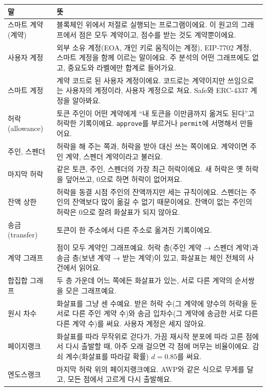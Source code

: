 \documentclass[11pt]{article}
\begin{document}
{\small
\renewcommand{\arraystretch}{1.25}
\begin{longtable}{@{}L{3.6cm}L{11.9cm}@{}}
\toprule
말 & 뜻 \\
\midrule
\endhead
스마트 계약(계약) & 블록체인 위에서 저절로 실행되는 프로그램이에요. 이 원고의 그래프에서 점은 모두 계약이고, 점수를 받는 것도 계약뿐이에요. \\
사용자 계정 & 외부 소유 계정(EOA, 개인 키로 움직이는 계정), EIP-7702 계정, 스마트 계정을 함께 이르는 말이에요. 주 분석의 어떤 그래프에도 없고, 중요도와 라벨에만 합계로 들어가요. \\
스마트 계정 & 계약 코드로 된 사용자 계정이에요. 코드로는 계약이지만 쓰임으로는 사용자의 계정이라, 사용자 계정으로 쳐요. Safe와 ERC-4337 계정을 알아봐요. \\
허락(allowance) & 토큰 주인이 어떤 계약에게 “내 토큰을 이만큼까지 옮겨도 된다”고 허락한 기록이에요. \texttt{approve}를 부르거나 \texttt{permit}에 서명해서 만들어요. \\
주인, 스펜더 & 허락을 해 주는 쪽과, 허락을 받아 대신 쓰는 쪽이에요. 계약이면 주인 계약, 스펜더 계약이라고 불러요. \\
마지막 허락 & 같은 토큰, 주인, 스펜더의 가장 최근 허락이에요. 새 허락은 옛 허락을 덮어쓰고, 0으로 하면 허락이 없어져요. \\
잔액 상한 & 허락을 동결 시점 주인의 잔액까지만 세는 규칙이에요. 스펜더는 주인의 잔액보다 많이 옮길 수 없기 때문이에요. 잔액이 없는 주인의 허락은 0으로 잘려 화살표가 되지 않아요. \\
송금(transfer) & 토큰이 한 주소에서 다른 주소로 옮겨진 기록이에요. \\
계약 그래프 & 점이 모두 계약인 그래프예요. 허락 층(주인 계약 → 스펜더 계약)과 송금 층(보낸 계약 → 받는 계약)이 있고, 화살표는 체인 전체의 사건에서 읽어요. \\
합집합 그래프 & 두 층 가운데 어느 쪽에든 화살표가 있는, 서로 다른 계약의 순서쌍을 모은 그래프예요. \\
원시 차수 & 화살표를 그냥 센 수예요. 받은 허락 수(그 계약에 양수의 허락을 둔 서로 다른 주인 계약 수)와 송금 입차수(그 계약에 송금한 서로 다른 다른 계약 수)를 써요. 사용자 계정은 세지 않아요. \\
페이지랭크 & 화살표를 따라 무작위로 걷다가, 가끔 재시작 분포에 따라 고른 점에서 다시 출발할 때, 아주 오래 걸으면 각 점에 머무는 비율이에요. 감쇠 계수(화살표를 따라갈 확률) $d=0.85$를 써요. \\
엔도스랭크 & 마지막 허락 위의 페이지랭크예요. AWP와 같은 식으로 무게를 달고, 모든 점에서 고르게 다시 출발해요. \\

\end{longtable}}
\end{document}
